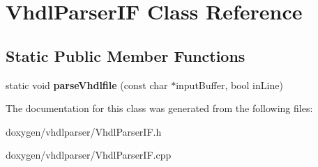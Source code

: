 \hypertarget{class_vhdl_parser_i_f}{}\section{Vhdl\+Parser\+IF Class Reference}
\label{class_vhdl_parser_i_f}
\subsection*{Static Public Member Functions}
\begin{DoxyCompactItemize}
\item 
\mbox{\label{class_vhdl_parser_i_f_a3af3a3bc5b64891cf921093cf386e0cb}} 
static void {\bfseries parse\+Vhdlfile} (const char $\ast$input\+Buffer, bool in\+Line)
\end{DoxyCompactItemize}


The documentation for this class was generated from the following files\+:\begin{DoxyCompactItemize}
\item 
doxygen/vhdlparser/Vhdl\+Parser\+I\+F.\+h\item 
doxygen/vhdlparser/Vhdl\+Parser\+I\+F.\+cpp\end{DoxyCompactItemize}
